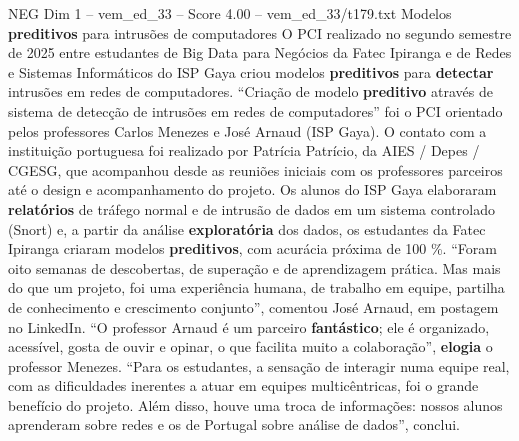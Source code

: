 \begin{textsample}{NEG Dim 1 – vem\_ed\_33 – Score 4.00 – vem\_ed\_33/t179.txt}  \label{ex:f1_neg_108}
Modelos \textbf{preditivos} para intrusões de computadores O PCI realizado no segundo semestre de 2025 entre estudantes de Big Data para Negócios da Fatec Ipiranga e de Redes e Sistemas Informáticos do ISP Gaya criou modelos \textbf{preditivos} para \textbf{detectar} intrusões em redes de computadores. “Criação de modelo \textbf{preditivo} através de sistema de detecção de intrusões em redes de computadores” foi o PCI orientado pelos professores Carlos Menezes e José Arnaud (ISP Gaya).
O contato com a instituição portuguesa foi realizado por Patrícia Patrício, da AIES / Depes / CGESG, que acompanhou desde as reuniões iniciais com os professores parceiros até o design e acompanhamento do projeto.
Os alunos do ISP Gaya elaboraram \textbf{relatórios} de tráfego normal e de intrusão de dados em um sistema controlado (Snort) e, a partir da análise \textbf{exploratória} dos dados, os estudantes da Fatec Ipiranga criaram modelos \textbf{preditivos}, com acurácia próxima de 100 \%. “Foram oito semanas de descobertas, de superação e de aprendizagem prática.
Mas mais do que um projeto, foi uma experiência humana, de trabalho em equipe, partilha de conhecimento e crescimento conjunto”, comentou José Arnaud, em postagem no LinkedIn. “O professor Arnaud é um parceiro \textbf{fantástico}; ele é organizado, acessível, gosta de ouvir e opinar, o que facilita muito a colaboração”, \textbf{elogia} o professor Menezes. “Para os estudantes, a sensação de interagir numa equipe real, com as dificuldades inerentes a atuar em equipes multicêntricas, foi o grande benefício do projeto.
Além disso, houve uma troca de informações: nossos alunos aprenderam sobre redes e os de Portugal sobre análise de dados”, conclui.

\end{textsample}
